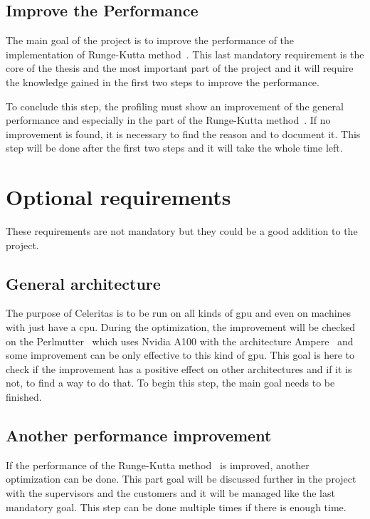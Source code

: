 \subsection{Improve the Performance}
\label{spec:ch:goals:mandatory-requirements:improve-the-performance}

The main goal of the project is to improve the performance of the implementation of Runge-Kutta method~\cite{Runge-Kutta-methods}.
This last mandatory requirement is the core of the thesis and the most important part of the project and it will require the knowledge gained in the first two steps to improve the performance.

To conclude this step, the profiling must show an improvement of the general performance and especially in the part of the Runge-Kutta method~\cite{Runge-Kutta-methods}.
If no improvement is found, it is necessary to find the reason and to document it.
This step will be done after the first two steps and it will take the whole time left.


\section{Optional requirements}
\label{spec:ch:goals:optional-requirements}

These requirements are not mandatory but they could be a good addition to the project.

\subsection{General architecture}
\label{spec:ch:goals:optional-requirements:general-optimization}

The purpose of Celeritas is to be run on all kinds of \acrshort{gpu} and even on machines with just have a \acrshort{cpu}.
During the optimization, the improvement will be checked on the Perlmutter~\cite{Perlmutter} which uses Nvidia A100 with the architecture Ampere~\cite{ampere} and some improvement can be only effective to this kind of \acrshort{gpu}.
This goal is here to check if the improvement has a positive effect on other architectures and if it is not, to find a way to do that.
To begin this step, the main goal needs to be finished.

\subsection{Another performance improvement}
\label{spec:ch:goals:optional-requirements:another-performance-improvement}

If the performance of the Runge-Kutta method~\cite{Runge-Kutta-methods} is improved, another optimization can be done.
This part goal will be discussed further in the project with the supervisors and the customers and it will be managed like the last mandatory goal.
This step can be done multiple times if there is enough time.

